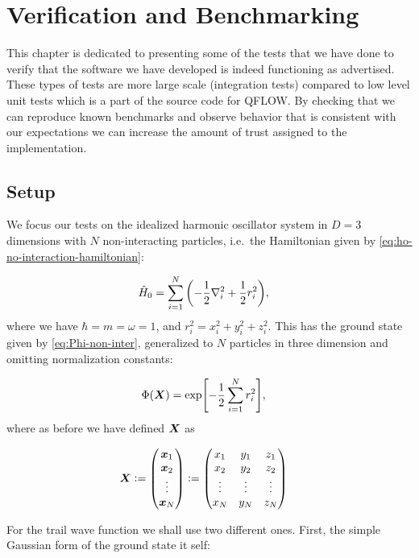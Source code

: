 \documentclass[Thesis.tex]{subfiles}
\begin{document}
\chapter{Verification and Benchmarking}
\label{chp:verfication}

This chapter is dedicated to presenting some of the tests that we have done to
verify that the software we have developed is indeed functioning as advertised.
These types of tests are more large scale (integration tests) compared to low
level unit tests which is a part of the source code for QFLOW. By checking that
we can reproduce known benchmarks and observe behavior that is consistent with
our expectations we can increase the amount of trust assigned to the implementation.

\section{Setup}

We focus our tests on the idealized harmonic oscillator system in $D = 3$ dimensions
with $N$ non-interacting particles, i.e.\ the Hamiltonian given by
\cref{eq:ho-no-interaction-hamiltonian}:

\begin{align}
    \hat H_0 &= \sum_{i=1}^N\qty(-\frac{1}{2}\laplacian_i +
    \frac{1}{2}r_i^2),
\end{align}
where we have $\hbar = m = \omega = 1$, and
$r_i^2 = x_i^2 + y_i^2+z_i^2$. This has the ground state given by
\cref{eq:Phi-non-inter}, generalized to $N$ particles in three dimension and
omitting normalization constants:

\begin{align}
        \Phi(\bm{X}) &= \exp[-\frac{1}{2}\sum_{i=1}^N r_i^2],
\end{align}
where as before we have defined $\bm{X}$ as

\begin{align}
  \mat X &\defeq \mqty(\vx_1\\\vx_2\\\vdots\\\vx_N) \defeq \mqty(x_1&y_1&z_1\\x_2&y_2&z_2\\\vdots&\vdots&\vdots\\x_N&y_N&z_N)
\end{align}

For the trail wave function we shall use two different ones. First, the simple
Gaussian form of the ground state it self:
\end{document}
